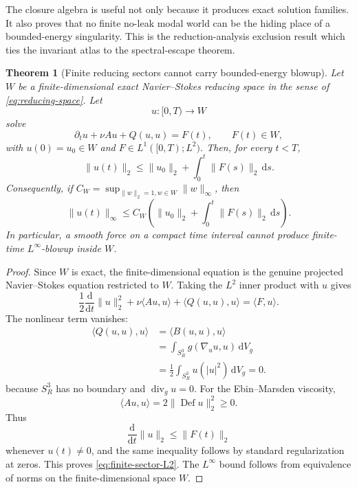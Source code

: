 \documentclass[aps,prd,reprint,superscriptaddress,nofootinbib,floatfix]{revtex4-2}
\newtheorem{theorem}{Theorem}
\theoremstyle{definition}
\theoremstyle{remark}
\newcommand{\dd}{\mathrm{d}}
\newcommand{\Def}{\operatorname{Def}}
\newcommand{\divg}{\operatorname{div}_g}
\begin{document}
The closure algebra is useful not only because it produces exact solution families.  It also proves that no finite no-leak modal world can be the hiding place of a bounded-energy singularity.  This is the reduction-analysis exclusion result which ties the invariant atlas to the spectral-escape theorem.

\begin{theorem}[Finite reducing sectors cannot carry bounded-energy blowup]
	\label{thm:finite-sector-no-blowup}
	Let \(W\) be a finite-dimensional exact Navier--Stokes reducing space in the sense of \eqref{eq:reducing-space}.  Let
	\[
		u:[0,T)\to W
	\]
	solve
	\[
		\partial_tu+\nu Au+Q(u,u)=F(t),\qquad F(t)\in W,
	\]
	with \(u(0)=u_0\in W\) and \(F\in L^1([0,T);L^2)\).  Then, for every \(t<T\),
	\begin{equation}
		\|u(t)\|_{2}
		\le
		\|u_0\|_{2}
		+\int_0^t\|F(s)\|_{2}\,\dd s .
		\label{eq:finite-sector-L2}
	\end{equation}
	Consequently, if \(C_W=\sup_{\|w\|_2=1,w\in W}\|w\|_\infty\), then
	\begin{equation}
		\|u(t)\|_{\infty}
		\le
		C_W\left(
		\|u_0\|_{2}
		+\int_0^t\|F(s)\|_{2}\,\dd s
		\right).
		\label{eq:finite-sector-Linf}
	\end{equation}
	In particular, a smooth force on a compact time interval cannot produce finite-time \(L^\infty\)-blowup inside \(W\).
\end{theorem}

\begin{proof}
	Since \(W\) is exact, the finite-dimensional equation is the genuine projected Navier--Stokes equation restricted to \(W\).  Taking the \(L^2\) inner product with \(u\) gives
	\[
		\frac12\frac{\dd}{\dd t}\|u\|_2^2
		+\nu\langle Au,u\rangle
		+\langle Q(u,u),u\rangle
		=
		\langle F,u\rangle .
	\]
	The nonlinear term vanishes:
	\begin{align*}
		\langle Q(u,u),u\rangle
		 & =\langle B(u,u),u\rangle                  \\
		 & =\int_{S^3_R} g(\nabla_u u,u)\,\dd V_g    \\
		 & =\frac12\int_{S^3_R}u(|u|^2)\,\dd V_g=0 .
	\end{align*}
	because \(S^3_R\) has no boundary and \(\divg u=0\).  For the Ebin--Marsden viscosity,
	\[
		\langle Au,u\rangle=2\|\Def u\|_2^2\ge0 .
	\]
	Thus
	\[
		\frac{\dd}{\dd t}\|u\|_2\le \|F(t)\|_2
	\]
	whenever \(u(t)\ne0\), and the same inequality follows by standard regularization at zeros.  This proves \eqref{eq:finite-sector-L2}.  The \(L^\infty\) bound follows from equivalence of norms on the finite-dimensional space \(W\).
\end{proof}
\end{document}
